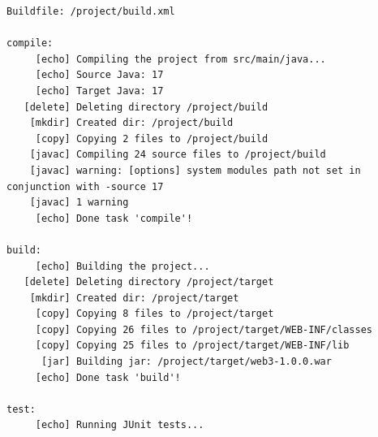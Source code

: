 \begin{lstlisting}[caption={Лог цели \texttt{test}},language={},captionpos=b]
Buildfile: /project/build.xml

compile:
     [echo] Compiling the project from src/main/java...
     [echo] Source Java: 17
     [echo] Target Java: 17
   [delete] Deleting directory /project/build
    [mkdir] Created dir: /project/build
     [copy] Copying 2 files to /project/build
    [javac] Compiling 24 source files to /project/build
    [javac] warning: [options] system modules path not set in conjunction with -source 17
    [javac] 1 warning
     [echo] Done task 'compile'!

build:
     [echo] Building the project...
   [delete] Deleting directory /project/target
    [mkdir] Created dir: /project/target
     [copy] Copying 8 files to /project/target
     [copy] Copying 26 files to /project/target/WEB-INF/classes
     [copy] Copying 25 files to /project/target/WEB-INF/lib
      [jar] Building jar: /project/target/web3-1.0.0.war
     [echo] Done task 'build'!

test:
     [echo] Running JUnit tests...


\end{lstlisting}
